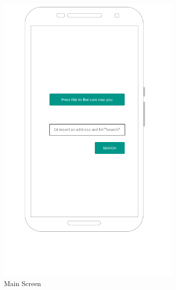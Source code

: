 \documentclass[12pt]{article}
\begin{document}
\begin{figure}[h!]
    \centering
    \begin{subfigure}[b]{0.45\textwidth}
        \includegraphics[width=\textwidth]{../UI/MainScreen}
        \caption{Main Screen}
    \end{subfigure}
    ~
    \begin{subfigure}[b]{0.45\textwidth}

\end{subfigure}
\end{figure}
\end{document}
